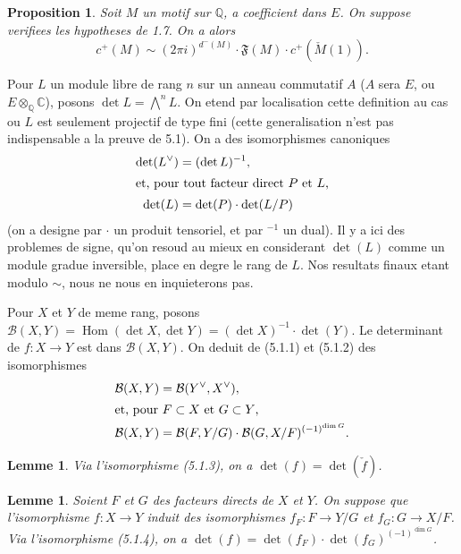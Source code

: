 \documentclass[12pt,a4paper]{article}
\theoremstyle{plain}
\newtheorem{lemma}[theorem]{Lemme}
\newtheorem{proposition}[theorem]{Proposition}
\theoremstyle{definition}
\theoremstyle{remark}
\DeclareMathOperator{\Hom}{Hom}
\newcommand{\Q}{\mathbb{Q}}
\newcommand{\C}{\mathbb{C}}
\begin{document}
\begin{proposition}\label{prop:5.1}
Soit $M$ un motif sur $\Q$, a coefficient dans $E$. On suppose verifiees les hypotheses
de 1.7. On a alors
\[
c^+(M) \sim (2\pi i)^{d^-(M)} \cdot \mathfrak{F}(M) \cdot c^+(\check{M}(1)).
\]
\end{proposition}

Pour $L$ un module libre de rang $n$ sur un anneau commutatif $A$ ($A$ sera $E$, ou
$E \otimes_\Q \C$), posons $\det L = \bigwedge^n L$. On etend par localisation cette definition au cas ou
$L$ est seulement projectif de type fini (cette generalisation n'est pas indispensable a la
preuve de 5.1). On a des isomorphismes canoniques
\begin{align}
\det(L^\vee) &= (\det L)^{-1}, \label{eq:5.1.1}\\
\intertext{et, pour tout facteur direct $P$ et $L$,}
\det(L) &= \det(P) \cdot \det(L/P) \label{eq:5.1.2}
\end{align}
(on a designe par $\cdot$ un produit tensoriel, et par $^{-1}$ un dual). Il y a ici des problemes
de signe, qu'on resoud au mieux en considerant $\det(L)$ comme un module gradue
inversible, place en degre le rang de $L$. Nos resultats finaux etant modulo $\sim$, nous
ne nous en inquieterons pas.

Pour $X$ et $Y$ de meme rang, posons $\mathcal{B}(X, Y) = \Hom(\det X, \det Y) =
(\det X)^{-1} \cdot \det(Y)$. Le determinant de $f: X \to Y$ est dans $\mathcal{B}(X, Y)$. On deduit de (5.1.1)
et (5.1.2) des isomorphismes
\begin{align}
\mathcal{B}(X, Y) &= \mathcal{B}(Y^\vee, X^\vee), \label{eq:5.1.3}\\
\intertext{et, pour $F \subset X$ et $G \subset Y$,}
\mathcal{B}(X, Y) &= \mathcal{B}(F, Y/G) \cdot \mathcal{B}(G, X/F)^{(-1)^{\dim G}}. \label{eq:5.1.4}
\end{align}

\begin{lemma}\label{lem:5.1.5}
Via l'isomorphisme (5.1.3), on a $\det(f) = \det(\check{f})$.
\end{lemma}

\begin{lemma}\label{lem:5.1.6}
Soient $F$ et $G$ des facteurs directs de $X$ et $Y$. On suppose que l'isomorphisme
$f: X \to Y$ induit des isomorphismes $f_F: F \to Y/G$ et $f_G: G \to X/F$. Via
l'isomorphisme (5.1.4), on a $\det(f) = \det(f_F) \cdot \det(f_G)^{(-1)^{\dim G}}$.
\end{lemma}
\end{document}
